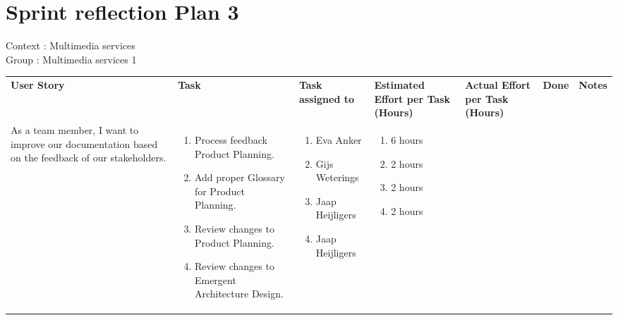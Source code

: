 \documentclass[11pt,a4paper,landscape]{article}
\begin{document}
\section*{Sprint reflection Plan 3}
Context : Multimedia services\\
Group : Multimedia services 1\\



\begin{table}[h]
\begin{tabular}{|p{3cm}|p{5.0cm}|p{3.0cm}|p{2.2cm}|p{2.2cm}|p{2.0cm}|p{5cm}}
\textbf{User Story} & \textbf{Task} & \textbf{Task assigned to} & \textbf{Estimated Effort per Task (Hours)} & \textbf{Actual Effort per Task (Hours)} & \textbf{Done} & \textbf{Notes}\\
As a team member, I want to improve our documentation based on the feedback of our stakeholders.

&
\begin{enumerate}
\item Process feedback Product Planning.
\item Add proper Glossary for Product Planning.
\item Review changes to Product Planning.
\item Review changes to Emergent Architecture Design.
\end{enumerate}

& 
\begin{enumerate}
\item Eva Anker
\item Gijs Weterings
\item Jaap Heijligers
\item Jaap Heijligers
\end{enumerate}

& 
\begin{enumerate}
\item 6 hours
\item 2 hours
\item 2 hours
\item 2 hours
\end{enumerate}



\end{tabular}
\end{table}
\end{document}
